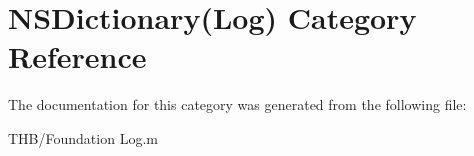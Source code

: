 \hypertarget{category_n_s_dictionary_07_log_08}{}\section{N\+S\+Dictionary(Log) Category Reference}
\label{category_n_s_dictionary_07_log_08}


The documentation for this category was generated from the following file\+:\begin{DoxyCompactItemize}
\item 
T\+H\+B/Foundation Log.\+m\end{DoxyCompactItemize}
